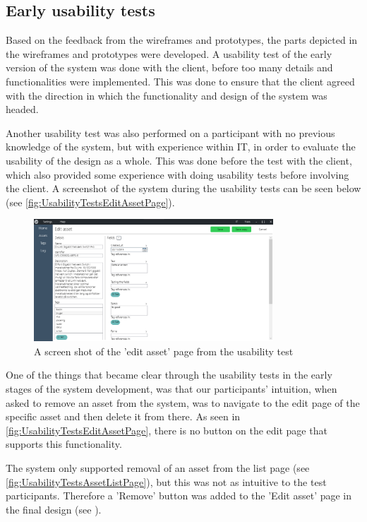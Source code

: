 \subsection{Early usability tests}
Based on the feedback from the wireframes and prototypes, the parts depicted in the wireframes and prototypes were developed. A usability test of the early version of the system was done with the client, before too many details and functionalities were implemented. This was done to ensure that the client agreed with the direction in which the functionality and design of the system was headed. 
\par
Another usability test was also performed on a participant with no previous knowledge of the system, but with experience within IT, in order to evaluate the usability of the design as a whole. This was done before the test with the client, which also provided some experience with doing usability tests before involving the client. A screenshot of the system during the usability tests can be seen below (see \autoref{fig:UsabilityTestsEditAssetPage}).

\begin{figure}[H]
    \centering
    \includegraphics[width=0.8\textwidth]{figures/PicturesOfTheSystem/Usabilitytest_editAsset.png}
    \caption{A screen shot of the 'edit asset' page from the usability test}
    \label{fig:UsabilityTestsEditAssetPage}
\end{figure}

One of the things that became clear through the usability tests in the early stages of the system development, was that our participants' intuition, when asked to remove an asset from the system, was to navigate to the edit page of the specific asset and then delete it from there. As seen in \autoref{fig:UsabilityTestsEditAssetPage}, there is no button on the edit page that supports this functionality.
\par
The system only supported removal of an asset from the list page (see \autoref{fig:UsabilityTestsAssetListPage}), but this was not as intuitive to the test participants. Therefore a 'Remove' button was added to the 'Edit asset' page in the final design (see ).

